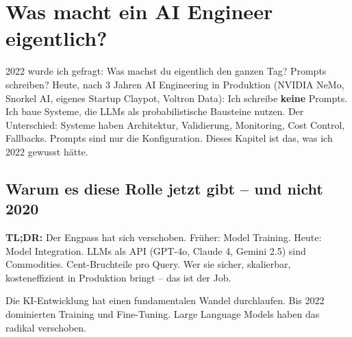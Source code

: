 \chapter{Was macht ein AI Engineer eigentlich?}
\label{chap:ai_engineer_rolle}




\par\mbox{}\par
\begin{AUTORnotizEnv}
2022 wurde ich gefragt: \glqq Was machst du eigentlich den ganzen Tag? Prompts schreiben?\grqq
Heute, nach 3 Jahren AI Engineering in Produktion (NVIDIA NeMo, Snorkel AI, eigenes Startup Claypot, Voltron Data):
Ich schreibe \textbf{keine} Prompts. Ich baue Systeme, die LLMs als probabilistische Bausteine nutzen.
Der Unterschied: Systeme haben Architektur, Validierung, Monitoring, Cost Control, Fallbacks.
Prompts sind nur die Konfiguration. Dieses Kapitel ist das, was ich 2022 gewusst hätte.
\end{AUTORnotizEnv}

\section{Warum es diese Rolle jetzt gibt -- und nicht 2020}




\par\mbox{}\par
\begin{praxishinweisEnv}
\textbf{TL;DR:} Der Engpass hat sich verschoben. Früher: Model Training. Heute: Model Integration.
LLMs als API (GPT-4o, Claude 4, Gemini 2.5) sind Commodities. Cent-Bruchteile pro Query.
Wer sie sicher, skalierbar, kosteneffizient in Produktion bringt -- das ist der Job.
\end{praxishinweisEnv}

Die KI-Entwicklung hat einen fundamentalen Wandel durchlaufen. Bis 2022 dominierten Training und Fine-Tuning. Large Language Models haben das radikal verschoben.

\par



